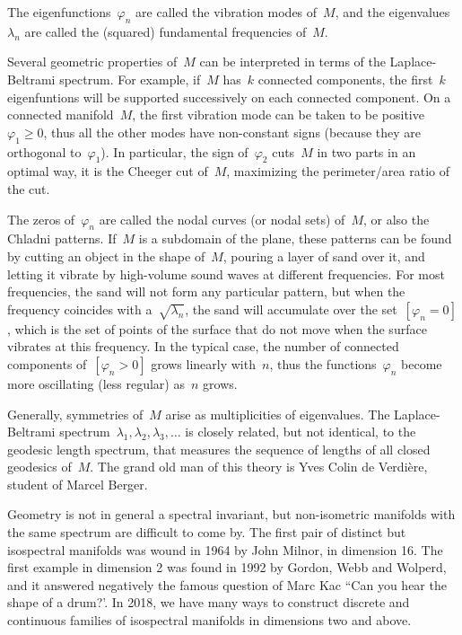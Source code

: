 The eigenfunctions~$\varphi_n$ are called the vibration modes of~$M$, and the
eigenvalues~$\lambda_n$ are called the (squared) fundamental frequencies of~$M$.

Several geometric properties of~$M$ can be interpreted in terms of the
Laplace-Beltrami spectrum.  For example, if~$M$ has~$k$ connected components,
the first~$k$ eigenfuntions will be supported successively on each connected
component.  On a connected manifold~$M$, the first vibration mode can be
taken to be positive~$\varphi_1\ge0$, thus all the other modes have
non-constant signs (because they are orthogonal to~$\varphi_1$).  In
particular, the sign of~$\varphi_2$ cuts~$M$ in two parts in an optimal way,
it is the Cheeger cut of~$M$, maximizing the perimeter/area ratio of the cut.

The zeros of~$\varphi_n$ are called the nodal curves (or nodal sets) of~$M$,
or also the Chladni patterns.  If~$M$ is a subdomain of the plane, these
patterns can be found by cutting an object in the shape of~$M$, pouring a
layer of sand over it, and letting it vibrate by high-volume sound waves at
different frequencies.  For most frequencies, the sand will not form any
particular pattern, but when the frequency coincides with
a~$\sqrt{\lambda_n}$, the sand will accumulate over the set~$[\varphi_n=0]$,
which is the set of points of the surface that do not move when the surface
vibrates at this frequency.  In the typical case, the number of connected
components of~$[\varphi_n>0]$ grows linearly with~$n$, thus the
functions~$\varphi_n$ become more oscillating (less regular) as~$n$ grows.

Generally, symmetries of~$M$ arise as multiplicities of eigenvalues.
The Laplace-Beltrami spectrum~${\lambda_1,\lambda_2,\lambda_3,\ldots}$ is
closely related, but not identical, to the geodesic length spectrum, that
measures the sequence of lengths of all closed geodesics of~$M$.  The grand
old man of this theory is Yves Colin de Verdière, student of Marcel Berger.

Geometry is not in general a spectral invariant, but non-isometric manifolds
with the same spectrum are difficult to come by.  The first pair of distinct
but isospectral manifolds was wound in 1964 by John Milnor, in dimension 16.
The first example in dimension 2 was found in 1992 by Gordon, Webb and
Wolperd, and it answered negatively the famous question of Marc Kac ``Can you
hear the shape of a drum?'.
In 2018, we have many ways to construct discrete and continuous families of
isospectral manifolds in dimensions two and above.


